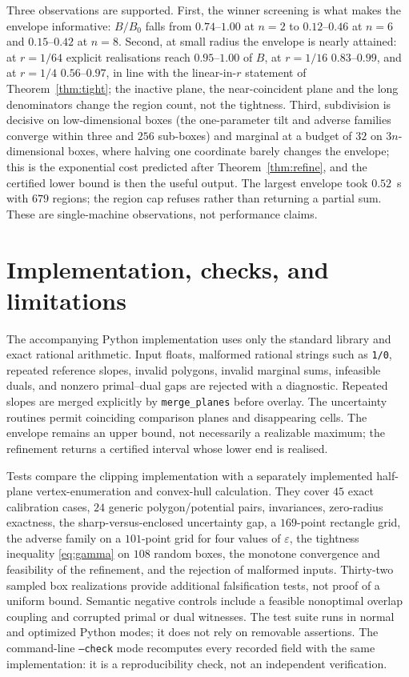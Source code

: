 \documentclass[11pt]{article}
\theoremstyle{remark}
\begin{document}
Three observations are supported. First, the winner screening is what makes
the envelope informative: $B/B_0$ falls from $0.74$--$1.00$ at $n=2$ to
$0.12$--$0.46$ at $n=6$ and $0.15$--$0.42$ at $n=8$. Second, at small radius
the envelope is nearly attained: at $r=1/64$ explicit realisations reach
$0.95$--$1.00$ of $B$, at $r=1/16$ $0.83$--$0.99$, and at $r=1/4$
$0.56$--$0.97$, in line with the linear-in-$r$ statement of
Theorem~\ref{thm:tight}; the inactive plane, the near-coincident plane and
the long denominators change the region count, not the tightness. Third,
subdivision is decisive on low-dimensional boxes (the one-parameter tilt and
adverse families converge within three and $256$ sub-boxes) and marginal at
a budget of $32$ on $3n$-dimensional boxes, where halving one coordinate
barely changes the envelope; this is the exponential cost predicted after
Theorem~\ref{thm:refine}, and the certified lower bound is then the useful
output. The largest envelope took $0.52$~s with $679$ regions; the region cap
refuses rather than returning a partial sum. These are single-machine
observations, not performance claims.

\section{Implementation, checks, and limitations}
The accompanying Python implementation uses only the standard library and
exact rational arithmetic. Input floats, malformed rational strings such as
\texttt{1/0}, repeated reference slopes, invalid polygons, invalid marginal
sums, infeasible duals, and nonzero primal--dual gaps are rejected with a
diagnostic. Repeated slopes are merged explicitly by \texttt{merge\_planes}
before overlay. The uncertainty routines permit coinciding comparison planes
and disappearing cells. The envelope remains an upper bound, not necessarily
a realizable maximum; the refinement returns a certified interval whose lower
end is realised.

Tests compare the clipping implementation with a separately implemented
half-plane vertex-enumeration and convex-hull calculation. They cover $45$
exact calibration cases, $24$ generic polygon/potential pairs, invariances,
zero-radius exactness, the sharp-versus-enclosed uncertainty gap, a
$169$-point rectangle grid, the adverse family on a $101$-point grid for four
values of $\varepsilon$, the tightness inequality \eqref{eq:gamma} on $108$
random boxes, the monotone convergence and feasibility of the refinement, and
the rejection of malformed inputs. Thirty-two sampled box realizations provide
additional falsification tests, not proof of a uniform bound. Semantic
negative controls include a feasible nonoptimal overlap coupling and
corrupted primal or dual witnesses. The test suite runs in normal and
optimized Python modes; it does not rely on removable assertions. The
command-line \texttt{--check} mode recomputes every recorded field with the
same implementation: it is a reproducibility check, not an independent
verification.
\end{document}
